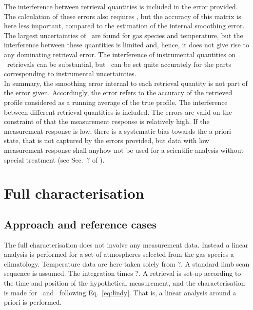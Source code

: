The interference between retrieval quantities is included in the error
provided. The calculation of these errors also requires \aCvrMtr{\SttVct}, but
the accuracy of this matrix is here less important, compared to the estimation
of the internal smoothing error. The largest uncertainties of
\aCvrMtr{\SttVct}\ are found for gas species and temperature, but the
interference between these quantities is limited and, hence, it does not give
rise to any dominating retrieval error. The interference of instrumental
quantities on \VMR\ retrievals can be substantial, but \aCvrMtr{\SttVct}\ can be
set quite accurately for the parts corresponding to instrumental uncertainties.\\

\noindent
In summary, the smoothing error internal to each retrieval quantity is not part
of the error given. Accordingly, the error refers to the accuracy of the
retrieved profile considered as a running average of the true profile. The
interference between different retrieval quantities is included. The errors are
valid on the constraint of that the measurement response is relatively high. If
the measurement response is low, there is a systematic bias towards the a
priori state, that is not captured by the errors provided, but data with
low measurement response shall anyhow not be used for a scientific analysis
without special treatment (see Sec.~? of \citet{rodgers:00}).



\section{Full characterisation}
%


\subsection{Approach and reference cases}
\label{sec:fullchar:select}
%
The full characterisation does not involve any measurement data. Instead a
linear analysis is performed for a set of atmospheres selected from the gas
species a climatology. Temperature data are here taken solely from
?. A standard limb scan sequence is assumed. The integration times
?. A retrieval is set-up according to the time and
position of the hypothetical measurement, and the characterisation is made for 
\aWfnMtr{\SttVct}\ and \CtrFncMtr\ following Eq.~\ref{eq:lindy}.
That is, a linear analysis around a priori is performed.
\\


